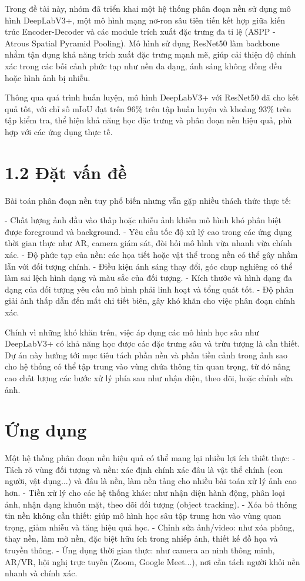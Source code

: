 \documentclass[12pt]{report}
\begin{document}
Trong đề tài này, nhóm đã triển khai một hệ thống phân đoạn nền sử dụng mô hình DeepLabV3+, một mô hình mạng nơ-ron sâu tiên tiến kết hợp giữa kiến trúc Encoder-Decoder và các module trích xuất đặc trưng đa tỉ lệ (ASPP - Atrous Spatial Pyramid Pooling). Mô hình sử dụng ResNet50 làm backbone nhằm tận dụng khả năng trích xuất đặc trưng mạnh mẽ, giúp cải thiện độ chính xác trong các bối cảnh phức tạp như nền đa dạng, ánh sáng không đồng đều hoặc hình ảnh bị nhiễu.

Thông qua quá trình huấn luyện, mô hình DeepLabV3+ với ResNet50 đã cho kết quả tốt, với chỉ số mIoU đạt trên 96\% trên tập huấn luyện và khoảng 93\% trên tập kiểm tra, thể hiện khả năng học đặc trưng và phân đoạn nền hiệu quả, phù hợp với các ứng dụng thực tế.

\section*{1.2 Đặt vấn đề}
Bài toán phân đoạn nền tuy phổ biến nhưng vẫn gặp nhiều thách thức thực tế:

- Chất lượng ảnh đầu vào thấp hoặc nhiễu ảnh khiến mô hình khó phân biệt được foreground và background.
- Yêu cầu tốc độ xử lý cao trong các ứng dụng thời gian thực như AR, camera giám sát, đòi hỏi mô hình vừa nhanh vừa chính xác.
- Độ phức tạp của nền: các họa tiết hoặc vật thể trong nền có thể gây nhầm lẫn với đối tượng chính.
- Điều kiện ánh sáng thay đổi, góc chụp nghiêng có thể làm sai lệch hình dạng và màu sắc của đối tượng.
- Kích thước và hình dạng đa dạng của đối tượng yêu cầu mô hình phải linh hoạt và tổng quát tốt.
- Độ phân giải ảnh thấp dẫn đến mất chi tiết biên, gây khó khăn cho việc phân đoạn chính xác.

Chính vì những khó khăn trên, việc áp dụng các mô hình học sâu như DeepLabV3+ có khả năng học được các đặc trưng sâu và trừu tượng là cần thiết. Dự án này hướng tới mục tiêu tách phần nền và phần tiền cảnh trong ảnh sao cho hệ thống có thể tập trung vào vùng chứa thông tin quan trọng, từ đó nâng cao chất lượng các bước xử lý phía sau như nhận diện, theo dõi, hoặc chỉnh sửa ảnh.

\section*{Ứng dụng}
Một hệ thống phân đoạn nền hiệu quả có thể mang lại nhiều lợi ích thiết thực:
- Tách rõ vùng đối tượng và nền: xác định chính xác đâu là vật thể chính (con người, vật dụng...) và đâu là nền, làm nền tảng cho nhiều bài toán xử lý ảnh cao hơn.
- Tiền xử lý cho các hệ thống khác: như nhận diện hành động, phân loại ảnh, nhận dạng khuôn mặt, theo dõi đối tượng (object tracking).
- Xóa bỏ thông tin nền không cần thiết: giúp mô hình học sâu tập trung hơn vào vùng quan trọng, giảm nhiễu và tăng hiệu quả học.
- Chỉnh sửa ảnh/video: như xóa phông, thay nền, làm mờ nền, đặc biệt hữu ích trong nhiếp ảnh, thiết kế đồ họa và truyền thông.
- Ứng dụng thời gian thực: như camera an ninh thông minh, AR/VR, hội nghị trực tuyến (Zoom, Google Meet...), nơi cần tách người khỏi nền nhanh và chính xác.
\end{document}
